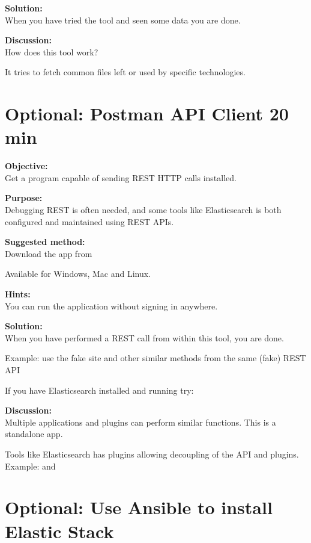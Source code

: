 \documentclass[a4paper,11pt,notitlepage]{report}
\begin{document}
{\bf Solution:}\\
When you have tried the tool and seen some data you are done.

{\bf Discussion:}\\
How does this tool work?

It tries to fetch common files left or used by specific technologies.





\chapter{Optional: Postman API Client 20 min}
\label{ex:postman-api}


{\bf Objective:}\\
Get a program capable of sending REST HTTP calls installed.


{\bf Purpose:}\\
Debugging REST is often needed, and some tools like Elasticsearch is both configured and maintained using REST APIs.

{\bf Suggested method:}\\
Download the app from

Available for Windows, Mac and Linux.

{\bf Hints:}\\
You can run the application without signing in anywhere.

{\bf Solution:}\\
When you have performed a REST call from within this tool, you are done.

Example: use the fake site  and other similar methods from the same (fake) REST API

If you have Elasticsearch installed and running try: 

{\bf Discussion:}\\
Multiple applications and plugins can perform similar functions. This is a standalone app.

Tools like Elasticsearch has plugins allowing decoupling of the API and plugins. Example:  and 



\chapter{Optional: Use Ansible to install Elastic Stack}
\label{ex:basicansible}
\end{document}
